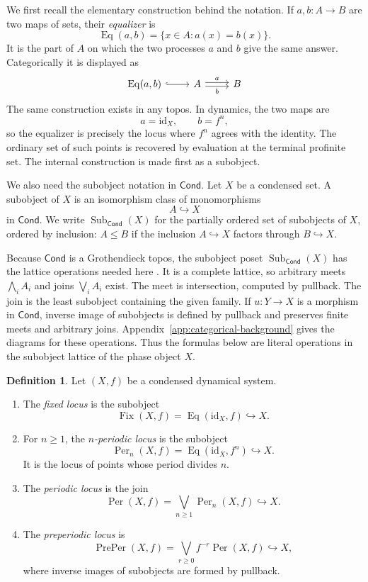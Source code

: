 \documentclass[10pt]{amsart}
\newcommand{\Cond}{\mathsf{Cond}}
\newcommand{\Sub}{\operatorname{Sub}}
\newcommand{\Eq}{\operatorname{Eq}}
\newcommand{\Fix}{\operatorname{Fix}}
\newcommand{\Per}{\operatorname{Per}}
\newcommand{\PrePer}{\operatorname{PrePer}}
\theoremstyle{plain}
\theoremstyle{definition}
\newtheorem{definition}[theorem]{Definition}
\begin{document}
We first recall the elementary construction behind the notation. If
$a,b:A\to B$ are two maps of sets, their \emph{equalizer} is
\[
  \Eq(a,b)=\{x\in A:a(x)=b(x)\}.
\]
It is the part of $A$ on which the two processes $a$ and $b$ give the same
answer. Categorically it is displayed as
\[
\begin{tikzcd}
\Eq(a,b) \arrow[r, hook] & A \arrow[r, shift left=0.45ex, "a"]
  \arrow[r, shift right=0.45ex, swap, "b"] & B
\end{tikzcd}
\]
The same construction exists in any topos. In dynamics, the two maps are
\[
  a=\mathrm{id}_X,\qquad b=f^n,
\]
so the equalizer is precisely the locus where $f^n$ agrees with the identity.
The ordinary set of such points is recovered by evaluation at the terminal
profinite set. The internal construction is made first as a subobject.

We also need the subobject notation in $\Cond$. Let $X$ be a condensed set. A
subobject of $X$ is an isomorphism class of
monomorphisms
\[
  A\hookrightarrow X
\]
in $\Cond$. We write $\Sub_{\Cond}(X)$ for the partially ordered set of
subobjects of $X$, ordered by inclusion: $A\le B$ if the inclusion
$A\hookrightarrow X$ factors through $B\hookrightarrow X$.

Because $\Cond$ is a Grothendieck topos, the subobject poset
$\Sub_{\Cond}(X)$ has the lattice operations needed here
\cite{MacLaneMoerdijk,JohnstoneTopos}. It is a complete lattice, so arbitrary
meets $\bigwedge_i A_i$ and joins $\bigvee_i A_i$ exist. The meet is
intersection, computed by pullback. The join is the least subobject containing
the given family. If $u:Y\to X$ is a morphism
in $\Cond$, inverse image of subobjects is defined by pullback and preserves
finite meets and arbitrary joins. Appendix~\ref{app:categorical-background}
gives the diagrams for these operations. Thus the formulas below are literal
operations in the subobject lattice of the phase object $X$.

\begin{definition}
Let $(X,f)$ be a condensed dynamical system.
\begin{enumerate}[label=(\alph*)]
\item The \emph{fixed locus} is the subobject
\[
  \Fix(X,f)=\Eq(\mathrm{id}_X,f)\hookrightarrow X.
\]
\item For $n\ge1$, the \emph{$n$-periodic locus} is the subobject
\[
  \Per_n(X,f)=\Eq(\mathrm{id}_X,f^n)\hookrightarrow X.
\]
It is the locus of points whose period divides $n$.
\item The \emph{periodic locus} is the join
\[
  \Per(X,f)=\bigvee_{n\ge1}\Per_n(X,f)\hookrightarrow X.
\]
\item The \emph{preperiodic locus} is
\[
  \PrePer(X,f)=\bigvee_{r\ge0}f^{-r}\Per(X,f)\hookrightarrow X,
\]
where inverse images of subobjects are formed by pullback.
\end{enumerate}
\end{definition}
\end{document}
